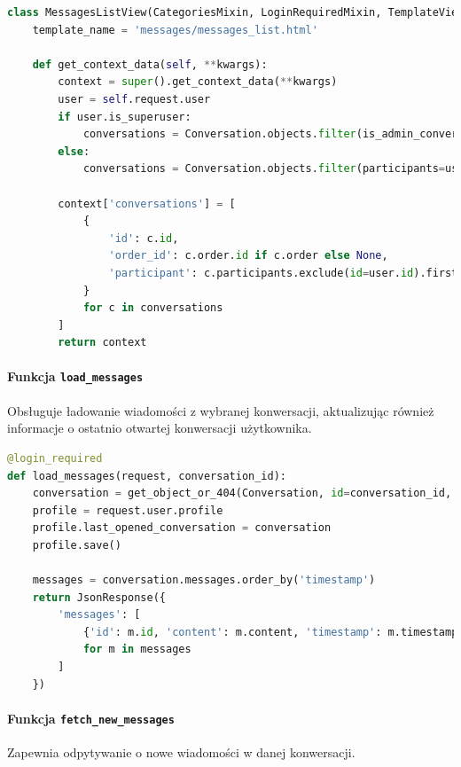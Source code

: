 \documentclass[12pt,a4paper,oneside]{article}
\theoremstyle{definition}
\numberwithin{equation}{section}
\begin{document}
\begin{lstlisting}[language=Python, caption=Widok \texttt{MessagesListView}]
class MessagesListView(CategoriesMixin, LoginRequiredMixin, TemplateView):
    template_name = 'messages/messages_list.html'

    def get_context_data(self, **kwargs):
        context = super().get_context_data(**kwargs)
        user = self.request.user
        if user.is_superuser:
            conversations = Conversation.objects.filter(is_admin_conversation=False)
        else:
            conversations = Conversation.objects.filter(participants=user)

        context['conversations'] = [
            {
                'id': c.id,
                'order_id': c.order.id if c.order else None,
                'participant': c.participants.exclude(id=user.id).first().username if user.is_superuser else None
            }
            for c in conversations
        ]
        return context
\end{lstlisting}



\paragraph{Funkcja \texttt{load\_messages}}
Obsługuje ładowanie wiadomości z wybranej konwersacji, aktualizując również informacje o ostatnio otwartej konwersacji użytkownika.

\begin{lstlisting}[language=Python, caption=Funkcja \texttt{load\_messages}]
@login_required
def load_messages(request, conversation_id):
    conversation = get_object_or_404(Conversation, id=conversation_id, participants=request.user)
    profile = request.user.profile
    profile.last_opened_conversation = conversation
    profile.save()

    messages = conversation.messages.order_by('timestamp')
    return JsonResponse({
        'messages': [
            {'id': m.id, 'content': m.content, 'timestamp': m.timestamp.strftime('%H:%M'), 'sender': m.sender.username}
            for m in messages
        ]
    })
\end{lstlisting}



\paragraph{Funkcja \texttt{fetch\_new\_messages}}
Zapewnia odpytywanie o nowe wiadomości w danej konwersacji.
\end{document}

